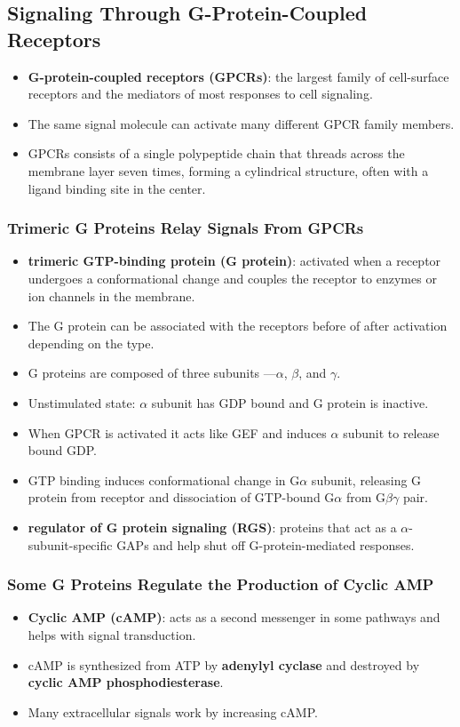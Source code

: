 \documentclass[12pt,a4paper]{article}
\begin{document}
\subsection{Signaling Through G-Protein-Coupled Receptors}
\begin{itemize}
    \item \textbf{G-protein-coupled receptors (GPCRs)}: the largest family of cell-surface receptors and the mediators of most responses to cell signaling.
    \item The same signal molecule can activate many different GPCR family members.
    \item GPCRs consists of a single polypeptide chain that threads across the membrane layer seven times, forming a cylindrical structure, often with a ligand binding site in the center.
\end{itemize}

\subsubsection{Trimeric G Proteins Relay Signals From GPCRs}
\begin{itemize}
    \item \textbf{trimeric GTP-binding protein (G protein)}: activated when a receptor undergoes a conformational change and couples the receptor to enzymes or ion channels in the membrane.
    \item The G protein can be associated with the receptors before of after activation depending on the type.
    \item G proteins are composed of three subunits ---$\alpha$, $\beta$, and $\gamma$.
    \item Unstimulated state: $\alpha$ subunit has GDP bound and G protein is inactive.
    \item When GPCR is activated it acts like GEF and induces $\alpha$ subunit to release bound GDP.
    \item GTP binding induces conformational change in G$\alpha$ subunit, releasing G protein from receptor and dissociation of GTP-bound G$\alpha$ from G$\beta$$\gamma$ pair.
    \item \textbf{regulator of G protein signaling (RGS)}: proteins that act as a $\alpha$-subunit-specific GAPs and help shut off G-protein-mediated responses.
\end{itemize}
\subsubsection{Some G Proteins Regulate the Production of Cyclic AMP}
\begin{itemize}
    \item \textbf{Cyclic AMP (cAMP)}: acts as a second messenger in some pathways and helps with signal transduction.
    \item cAMP is synthesized from ATP by \textbf{adenylyl cyclase} and destroyed by \textbf{cyclic AMP phosphodiesterase}.
    \item Many extracellular signals work by increasing cAMP.
\end{itemize}
\end{document}
